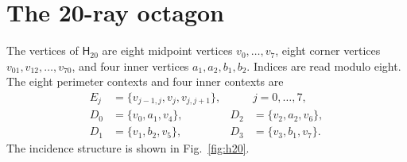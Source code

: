 \documentclass[twocolumn,aps,pra,floatfix,amsmath,amssymb,longbibliography]{revtex4-2}
\theoremstyle{definition}
\theoremstyle{remark}
\newcommand{\Htwenty}{\mathsf H_{20}}
\begin{document}
\section{The 20-ray octagon}
\label{sec:h20}

The vertices of $\Htwenty$ are eight midpoint vertices
$v_0,\ldots,v_7$, eight corner vertices
$v_{01},v_{12},\ldots,v_{70}$, and four inner vertices
$a_1,a_2,b_1,b_2$.  Indices are read modulo eight.  The eight perimeter
contexts and four inner contexts are
\begin{align}
 E_j&=\{v_{j-1,j},v_j,v_{j,j+1}\}, &&j=0,\ldots,7,
 \label{eq:perimeter-contexts}\\
 D_0&=\{v_0,a_1,v_4\},&D_2&=\{v_2,a_2,v_6\},\nonumber\\
 D_1&=\{v_1,b_2,v_5\},&D_3&=\{v_3,b_1,v_7\}.
 \label{eq:inner-contexts}
\end{align}
The incidence structure is shown in Fig.~\ref{fig:h20}.
\end{document}
